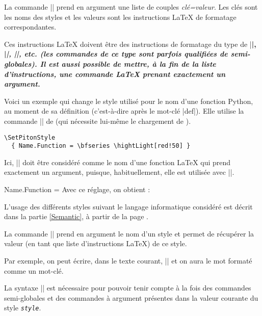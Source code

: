 \documentclass[dvipsnames,svgnames]{article}
\begin{document}
\bigskip
{}
La commande |\SetPitonStyle| prend en argument une liste de couples \textsl{clé=valeur}. Les clés sont les noms des
styles et les valeurs sont les instructions LaTeX de formatage correspondantes.

\bigskip
Ces instructions LaTeX doivent être des instructions de formatage du type de |\bfseries|, |\slshape|,
|\color{...}|, etc. (les commandes de ce type sont parfois qualifiées de \emph{semi-globales}). Il est aussi
possible de mettre, \emph{à la fin de la liste d'instructions}, une commande LaTeX prenant exactement un argument.

\bigskip
Voici un exemple qui change le style utilisé pour le nom d'une fonction Python, au moment de sa définition
(c'est-à-dire après le mot-clé |def|). Elle utilise la commande |\highLight| de  (qui nécessite
lui-même le chargement de ).

\begin{Verbatim}
\SetPitonStyle
  { Name.Function = \bfseries \hightLight[red!50] }
\end{Verbatim}

Ici, |\highLight[red!50]| doit être considéré comme le nom d'une fonction LaTeX qui prend exactement un argument,
puisque, habituellement, elle est utilisée avec ||.

\medskip
\begingroup
\SetPitonStyle 
  { Name.Function = \bfseries \highLight[red!50] }
Avec ce réglage, on obtient : 
\endgroup


\bigskip
L'usage des différents styles suivant le langage informatique considéré est décrit dans la partie \ref{Semantic}, à
partir de la page \pageref{Semantic}. 



\bigskip
{}
La commande |\PitonStyle| prend en argument le nom d'un style et permet de récupérer la valeur (en tant que liste
d'instructions LaTeX) de ce style.

\smallskip
Par exemple, on peut écrire, dans le texte courant, |{}| et on aura 
le mot {} formaté comme un mot-clé.

\smallskip
La syntaxe |{}| est nécessaire pour pouvoir tenir compte à la fois des commandes
semi-globales et des commandes à argument présentes dans la valeur courante du style \texttt{\textsl{style}}.
\end{document}
